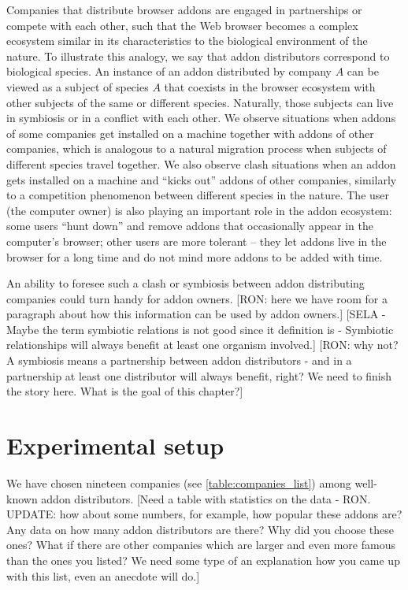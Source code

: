 \documentclass[11pt,oneside]{book}
\let\Oldsection\section
\renewcommand{\section}{\FloatBarrier\Oldsection}
\begin{document}
Companies that distribute browser addons are engaged in partnerships or compete with each other, such that the Web browser becomes a complex ecosystem similar in its characteristics to the biological environment of the nature. To illustrate this analogy, we say that addon distributors correspond to biological species. An instance of an addon distributed by company $A$ can be viewed as a subject of species $A$ that coexists in the browser ecosystem with other subjects of the same or different species. Naturally, those subjects can live in symbiosis or in a conflict with each other. We observe situations when addons of some companies get installed on a machine together with addons of other companies, which is analogous to a natural migration process when subjects of different species travel together. We also observe clash situations when an addon gets installed on a machine and ``kicks out'' addons of other companies, similarly to a competition phenomenon between different species in the nature. The user (the computer owner) is also playing an important role in the addon ecosystem: some users ``hunt down'' and remove addons that occasionally appear in the computer's browser; other users are more tolerant -- they let addons live in the browser for a long time and do not mind more addons to be added with time.

An ability to foresee such a clash or symbiosis between addon distributing companies could turn handy for addon owners. [RON: here we have room for a paragraph about how this information can be used by addon owners.]
[SELA - Maybe the term symbiotic relations is not good since it definition is  - Symbiotic relationships will always benefit at least one organism involved.] [RON: why not? A symbiosis means a partnership between addon distributors - and in a partnership at least one distributor will always benefit, right? We need to finish the story here. What is the goal of this chapter?]

\section{Experimental setup}
We have chosen nineteen companies (see \autoref{table:companies_list}) among well-known addon distributors. [Need a table with statistics on the data - RON. UPDATE: how about some numbers, for example, how popular these addons are? Any data on how many addon distributors are there? Why did you choose these ones? What if there are other companies which are larger and even more famous than the ones you listed? We need some type of an explanation how you came up with this list, even an anecdote will do.]
\end{document}
